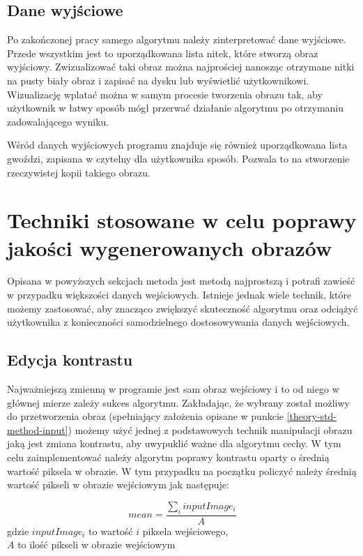 \documentclass[a4paper, 12pt, polish, twoside]{extreport}
\begin{document}
        \subsection{Dane wyjściowe} \label{theory-std-method-output}
        Po zakończonej pracy samego algorytmu należy zinterpretować dane wyjściowe. Przede wszystkim jest to uporządkowana lista nitek, które stworzą obraz wyjściowy. Zwizualizować taki obraz można najprościej nanosząc otrzymane nitki na pusty biały obraz i zapisać na dysku lub wyświetlić użytkownikowi. Wizualizację wplatać można w samym procesie tworzenia obrazu tak, aby użytkownik w łatwy sposób mógł przerwać działanie algorytmu po otrzymaniu zadowalającego wyniku.
        
        Wśród danych wyjściowych programu znajduje się również uporządkowana lista gwoździ, zapisana w czytelny dla użytkownika sposób. Pozwala to na stworzenie rzeczywistej kopii takiego obrazu.
        
    \section{Techniki stosowane w celu poprawy jakości wygenerowanych obrazów} \label{theory-technics}
    Opisana w powyższych sekcjach metoda jest metodą najprostszą i potrafi zawieść w przypadku większości danych wejściowych. Istnieje jednak wiele technik, które możemy zastosować, aby znacząco zwiększyć skuteczność algorytmu oraz odciążyć użytkownika z konieczności samodzielnego dostosowywania danych wejściowych.
        \subsection{Edycja kontrastu} \label{theory-technics-contrast}
        Najważniejszą zmienną w programie jest sam obraz wejściowy i to od niego w głównej mierze zależy sukces algorytmu. Zakładając, że wybrany został możliwy do przetworzenia obraz (spełniający założenia opisane w punkcie \ref{theory-std-method-input}) możemy użyć jednej z podstawowych technik manipulacji obrazu jaką jest zmiana kontrastu, aby uwypuklić ważne dla algorytmu cechy. W tym celu zaimplementować należy algorytm poprawy kontrastu oparty o średnią wartość piksela w obrazie. W tym przypadku na początku policzyć należy średnią wartość pikseli w obrazie wejściowym jak następuje:
        
        \begin{equation} \label{theory-technics-contrast-mean}
            mean = \frac{\sum_{i} inputImage_{i}}{A}
        \end{equation}
        gdzie \(inputImage_{i}\) to wartość \(i\) piksela wejściowego, \\
        \(A\) to ilość pikseli w obrazie wejściowym
        
\end{document}
